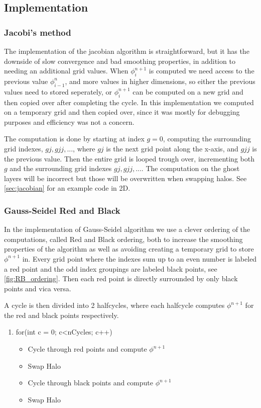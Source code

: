 
	\subsection{Implementation}
		\subsubsection{Jacobi's method}
		The implementation of the jacobian algorithm is straightforward, but it has the downside of slow convergence and
		bad smoothing properties, in addition to needing an additional grid values. When \(\phi^{n+1}_{i}\) is computed
		we need access to the previous value \(\phi^n_{i-1}\), and more values in higher dimensions, so either the previous values
		need to stored seperately, or \(\phi^{n+1}_{i}\) can be computed on a new grid and then copied over after completing the cycle.
		In this implementation we computed on a temporary grid and then copied over, since it was mostly for debugging purposes and
		efficiency was not a concern.

		The computation is done by starting at index \(g=0\), computing the surrounding grid indexes, \(gj, gjj,...\), where \(gj\)
		is the next grid point along the x-axis, and \(gjj\) is the previous value. Then the entire grid is looped trough over, incrementing
		both \(g\) and the surrounding grid indexes \(gj, gjj,...\). The computation on the ghost layers will be incorrect but those will be overwritten
		when swapping halos. See \ref{sec:jacobian} for an example code in 2D.

		\subsubsection{Gauss-Seidel Red and Black}
		In the implementation of Gauss-Seidel algorithm we use a clever ordering of the computations,
		called Red and Black ordering, both to increase the smoothing properties of the algorithm as well as avoiding
 		creating a temporary grid to store \(\phi^{n+1}\) in. Every grid point where the indexes sum up to an even number
		is labeled a red point and the odd index groupings are labeled black points, see \cref{fig:RB_ordering}. Then
		each red point is directly surrounded by only black points and vica versa.

		A cycle is then divided into 2 halfcycles, where each halfcycle computes \(\phi^{n+1}\) for the red and black points respectively.

		\begin{enumerate}
			\item for(int c = 0; c<nCycles; c++)
				\begin{itemize}
					\item Cycle through red points and compute \(\phi^{n+1}\)
					\item Swap Halo
					\item Cycle through black points and compute \(\phi^{n+1}\)
					\item Swap Halo
				\end{itemize}
		\end{enumerate}

